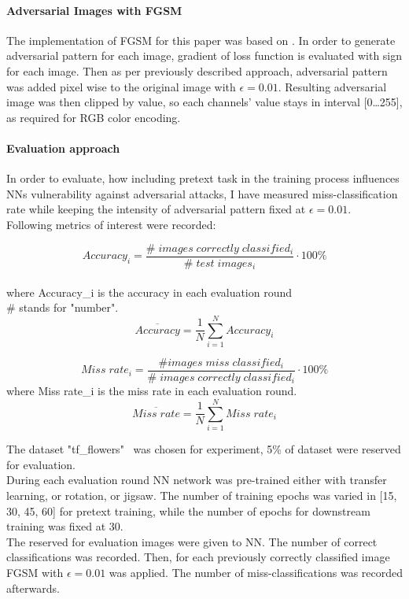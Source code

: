 \paragraph{Adversarial Images with FGSM}
The implementation of FGSM for this paper was based on \cite{FGSM}.
In order to generate adversarial pattern for each image,
gradient of loss function is evaluated with sign for each image.
Then as per previously described approach,
adversarial pattern was added pixel wise to the original image with $\epsilon = 0.01$.
Resulting adversarial image was then clipped by value, so each channels' value stays in interval [0\ldots255],
as required for RGB color encoding.

\paragraph{Evaluation approach}
In order to evaluate, how including pretext task in the training process influences NNs vulnerability against adversarial attacks,
I have measured miss-classification rate while keeping the intensity of adversarial pattern fixed at $\epsilon = 0.01$.
\\
Following metrics of interest were recorded:

\begin{equation}
    Accuracy_i = \frac{\# \; images \; correctly \; classified_i}{\# \; test \; images_i} \cdot 100 \%
\end{equation} \\
where Accuracy\_i is the accuracy in each evaluation round \\
\# stands for "number".
\begin{equation}
    \overline{Accuracy} = \frac{1}{N}  \sum_{i=1}^{N}{Accuracy_i}
\end{equation}


\begin{equation}
    Miss \; rate_i = \frac{\# images \; miss \; classified_i}{\# \; images \; correctly \; classified_i} \cdot 100 \%
\end{equation}
where Miss rate\_i is the miss rate in each evaluation round.
\begin{equation}
    \overline{Miss \; rate} = \frac{1}{N}  \sum_{i=1}^{N}{Miss \; rate_i}
\end{equation}


The dataset "tf\_flowers"~\cite{tfflowers} was chosen for experiment, 5\% of dataset were reserved for evaluation.
\\
During each evaluation round NN network was pre-trained either with transfer learning, or rotation, or jigsaw.
The number of training epochs was varied in [15, 30, 45, 60] for pretext training, while the number of epochs for downstream
training was fixed at 30.
\\
The reserved for evaluation images were given to NN. The number of correct classifications was recorded.
Then, for each previously correctly classified image FGSM with $\epsilon = 0.01$ was applied.
The number of miss-classifications was recorded afterwards.
